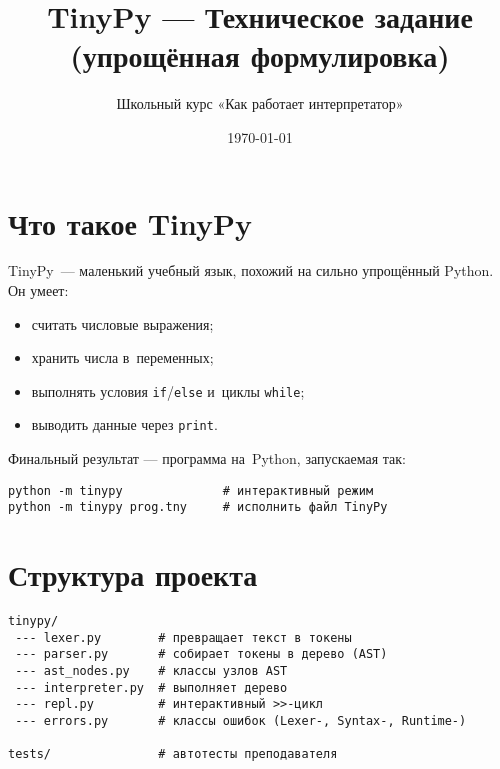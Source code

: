 \documentclass[12pt]{article}
\title{TinyPy — Техническое задание (упрощённая формулировка)}
\author{Школьный курс «Как работает интерпретатор»}
\date{\today}
\begin{document}
\maketitle
\tableofcontents
\newpage

\section{Что такое TinyPy}
TinyPy — маленький учебный язык, похожий на сильно упрощённый Python. Он умеет:
\begin{itemize}
	\item считать числовые выражения;
	\item хранить числа в переменных;
	\item выполнять условия \texttt{if}/\texttt{else} и циклы \texttt{while};
	\item выводить данные через \texttt{print}.
\end{itemize}
Финальный результат — программа на~Python, запускаемая так:
\begin{verbatim}
python -m tinypy              # интерактивный режим
python -m tinypy prog.tny     # исполнить файл TinyPy
\end{verbatim}

\section{Структура проекта}
\begin{verbatim}
tinypy/
 --- lexer.py        # превращает текст в токены
 --- parser.py       # собирает токены в дерево (AST)
 --- ast_nodes.py    # классы узлов AST
 --- interpreter.py  # выполняет дерево
 --- repl.py         # интерактивный >>-цикл
 --- errors.py       # классы ошибок (Lexer-, Syntax-, Runtime-)

tests/               # автотесты преподавателя
\end{verbatim}

\end{document}
